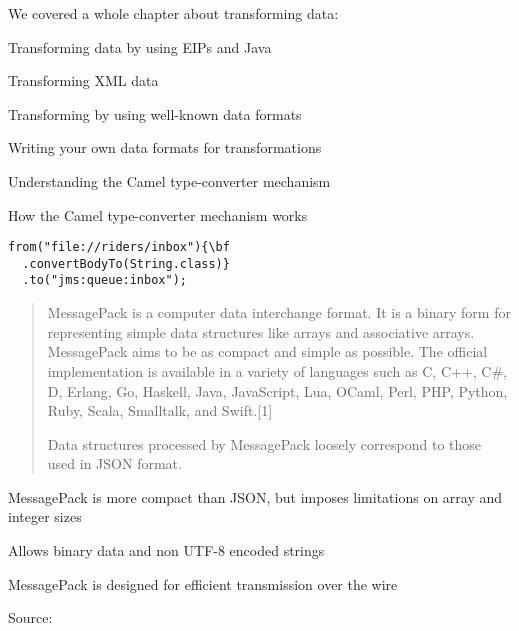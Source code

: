 \documentclass[Screen16to9,17pt]{foils}
\begin{document}



We covered a whole chapter about transforming data:
\begin{list2}
\item Transforming data by using EIPs and Java
\item Transforming XML data
\item Transforming by using well-known data formats
\item Writing your own data formats for
transformations
\item Understanding the Camel type-converter
mechanism
\end{list2}


\begin{list2}
\item How the Camel type-converter mechanism works
\end{list2}

\begin{verbatim}
from("file://riders/inbox"){\bf
  .convertBodyTo(String.class)}
  .to("jms:queue:inbox");
\end{verbatim}


\begin{quote}
MessagePack is a computer data interchange format. It is a binary form for representing simple data structures like arrays and associative arrays. MessagePack aims to be as compact and simple as possible. The official implementation is available in a variety of languages such as C, C++, C\#, D, Erlang, Go, Haskell, Java, JavaScript, Lua, OCaml, Perl, PHP, Python, Ruby, Scala, Smalltalk, and Swift.[1]{\bf

Data structures processed by MessagePack loosely correspond to those used in JSON format.}
\end{quote}

\begin{list2}
\item MessagePack is more compact than JSON, but imposes limitations on array and integer sizes
\item Allows binary data and non UTF-8 encoded strings
\item MessagePack is designed for efficient transmission over the wire
\end{list2}
Source: {\footnotesize\\
}
\end{document}
